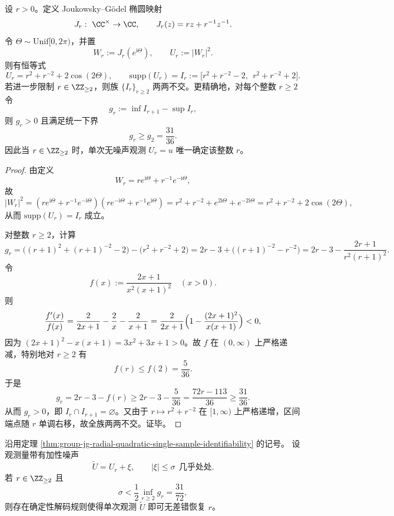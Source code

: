\begin{theorem}\label{thm:group-jg-radial-quadratic-single-sample-identifiability}
设 \(r>0\)。定义 Joukowsky--Gödel 椭圆映射
\[
J_r:\ \CC^\times\to\CC,\qquad J_r(z)=rz+r^{-1}z^{-1}.
\]
令 \(\Theta\sim \mathrm{Unif}[0,2\pi)\)，并置
\[
W_r:=J_r(e^{\mathrm{i}\Theta}),\qquad U_r:=|W_r|^2.
\]
则有恒等式
\[
U_r=r^2+r^{-2}+2\cos(2\Theta),
\qquad
\mathrm{supp}(U_r)=I_r:=\bigl[r^2+r^{-2}-2,\ \ r^2+r^{-2}+2\bigr].
\]
若进一步限制 \(r\in\ZZ_{\ge 2}\)，则族 \(\{I_r\}_{r\ge 2}\) 两两不交。更精确地，对每个整数 \(r\ge 2\) 令
\[
g_r:=\inf I_{r+1}-\sup I_r,
\]
则 \(g_r>0\) 且满足统一下界
\[
g_r\ge g_2=\frac{31}{36}.
\]
因此当 \(r\in\ZZ_{\ge 2}\) 时，单次无噪声观测 \(U_r=u\) 唯一确定该整数 \(r\)。
\end{theorem}

\begin{proof}
由定义
\[
W_r=r e^{\mathrm{i}\Theta}+r^{-1}e^{-\mathrm{i}\Theta},
\]
故
\[
|W_r|^2
=(r e^{\mathrm{i}\Theta}+r^{-1}e^{-\mathrm{i}\Theta})(r e^{-\mathrm{i}\Theta}+r^{-1}e^{\mathrm{i}\Theta})
=r^2+r^{-2}+e^{2\mathrm{i}\Theta}+e^{-2\mathrm{i}\Theta}
=r^2+r^{-2}+2\cos(2\Theta),
\]
从而 \(\mathrm{supp}(U_r)=I_r\) 成立。
\par
对整数 \(r\ge 2\)，计算
\[
g_r=\bigl((r+1)^2+(r+1)^{-2}-2\bigr)-\bigl(r^2+r^{-2}+2\bigr)
=2r-3+\bigl((r+1)^{-2}-r^{-2}\bigr)
=2r-3-\frac{2r+1}{r^2(r+1)^2}.
\]
令
\[
f(x):=\frac{2x+1}{x^2(x+1)^2}\quad(x>0).
\]
则
\[
\frac{f'(x)}{f(x)}
=\frac{2}{2x+1}-\frac{2}{x}-\frac{2}{x+1}
=\frac{2}{2x+1}\Bigl(1-\frac{(2x+1)^2}{x(x+1)}\Bigr)<0,
\]
因为 \((2x+1)^2-x(x+1)=3x^2+3x+1>0\)。故 \(f\) 在 \((0,\infty)\) 上严格递减，特别地对 \(r\ge 2\) 有
\[
f(r)\le f(2)=\frac{5}{36}.
\]
于是
\[
g_r=2r-3-f(r)\ge 2r-3-\frac{5}{36}
=\frac{72r-113}{36}\ge \frac{31}{36}.
\]
从而 \(g_r>0\)，即 \(I_r\cap I_{r+1}=\varnothing\)。又由于 \(r\mapsto r^2+r^{-2}\) 在 \([1,\infty)\) 上严格递增，区间端点随 \(r\) 单调右移，故全族两两不交。证毕。
\end{proof}

\begin{corollary}[有界噪声下的单样本恢复阈值]\label{cor:group-jg-radial-quadratic-bounded-noise-threshold}
沿用定理 \ref{thm:group-jg-radial-quadratic-single-sample-identifiability} 的记号。
设观测量带有加性噪声
\[
\widetilde U=U_r+\xi,\qquad |\xi|\le \sigma\ \ \text{几乎处处}.
\]
若 \(r\in\ZZ_{\ge 2}\) 且
\[
\sigma<\frac{1}{2}\inf_{r\ge 2}g_r=\frac{31}{72},
\]
则存在确定性解码规则使得单次观测 \(\widetilde U\) 即可无差错恢复 \(r\)。
\end{corollary}

